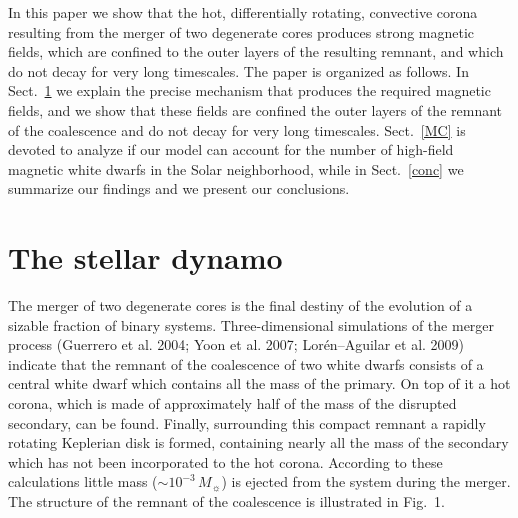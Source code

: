 \documentclass[]{emulateapj}
\begin{document}
In  this  paper  we   show  that  the  hot,  differentially  rotating,
convective corona  resulting from the  merger of two  degenerate cores
produces  strong magnetic  fields,  which are  confined  to the  outer
layers of the resulting remnant, and  which do not decay for very long
timescales. The  paper is organized as  follows. In Sect.~\ref{dynamo}
we explain  the precise mechanism that produces  the required magnetic
fields, and we show that these fields are confined the outer layers of
the  remnant  of  the coalescence  and  do  not  decay for  very  long
timescales.   Sect.~\ref{MC} is devoted  to analyze  if our  model can
account  for the  number of  high-field magnetic  white dwarfs  in the
Solar  neighborhood,  while   in  Sect.~\ref{conc}  we  summarize  our
findings and we present our conclusions.

\section{The stellar dynamo}
\label{dynamo}

The  merger  of two  degenerate  cores is  the  final  destiny of  the
evolution of  a sizable fraction of  binary systems. Three-dimensional
simulations  of the  merger process  (Guerrero et  al.  2004;  Yoon et
al. 2007; Lor\'en--Aguilar  et al. 2009) indicate that  the remnant of
the coalescence of two white  dwarfs consists of a central white dwarf
which contains all the mass of the primary. On top of it a hot corona,
which  is made  of approximately  half of  the mass  of  the disrupted
secondary, can  be found. Finally, surrounding this  compact remnant a
rapidly rotating  Keplerian disk is formed, containing  nearly all the
mass  of the  secondary which  has not  been incorporated  to  the hot
corona. According  to these calculations little  mass ($\sim 10^{-3}\,
M_{\sun}$) is ejected from the system during the merger. The structure
of the remnant of the coalescence is illustrated in Fig.~1.
\end{document}
